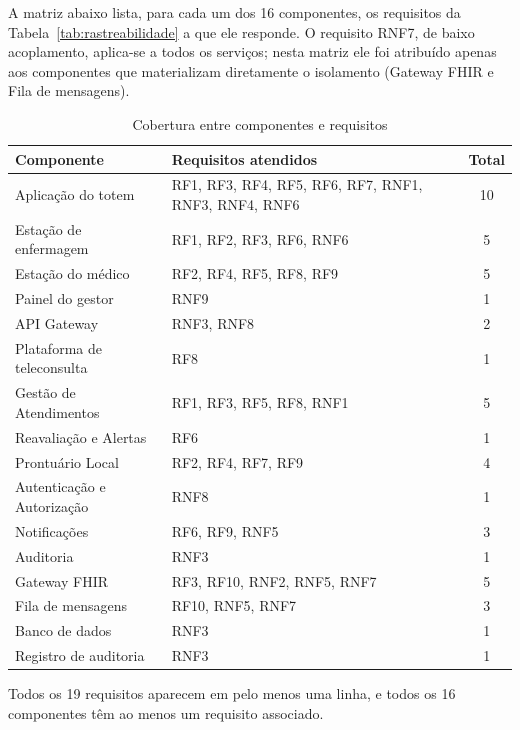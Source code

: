 A matriz abaixo lista, para cada um dos 16 componentes, os requisitos da Tabela~\ref{tab:rastreabilidade} a que ele responde. O requisito RNF7, de baixo acoplamento, aplica-se a todos os serviços; nesta matriz ele foi atribuído apenas aos componentes que materializam diretamente o isolamento (Gateway FHIR e Fila de mensagens).

\begin{table}[H]
\centering
\caption{Cobertura entre componentes e requisitos}
\label{tab:cobertura}
\footnotesize
\begin{tabularx}{\textwidth}{L{5.0cm} Y c}
\toprule
\textbf{Componente} & \textbf{Requisitos atendidos} & \textbf{Total} \\
\midrule
Aplicação do totem & RF1, RF3, RF4, RF5, RF6, RF7, RNF1, RNF3, RNF4, RNF6 & 10 \\
Estação de enfermagem & RF1, RF2, RF3, RF6, RNF6 & 5 \\
Estação do médico & RF2, RF4, RF5, RF8, RF9 & 5 \\
Painel do gestor & RNF9 & 1 \\
API Gateway & RNF3, RNF8 & 2 \\
Plataforma de teleconsulta & RF8 & 1 \\
Gestão de Atendimentos & RF1, RF3, RF5, RF8, RNF1 & 5 \\
Reavaliação e Alertas & RF6 & 1 \\
Prontuário Local & RF2, RF4, RF7, RF9 & 4 \\
Autenticação e Autorização & RNF8 & 1 \\
Notificações & RF6, RF9, RNF5 & 3 \\
Auditoria & RNF3 & 1 \\
Gateway FHIR & RF3, RF10, RNF2, RNF5, RNF7 & 5 \\
Fila de mensagens & RF10, RNF5, RNF7 & 3 \\
Banco de dados & RNF3 & 1 \\
Registro de auditoria & RNF3 & 1 \\
\bottomrule
\end{tabularx}
\end{table}

Todos os 19 requisitos aparecem em pelo menos uma linha, e todos os 16 componentes têm ao menos um requisito associado.